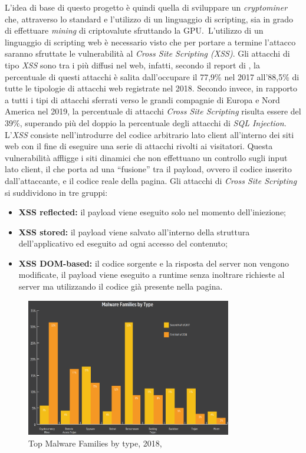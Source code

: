 \documentclass[conference]{IEEEtran}
\newcommand\citen[1]{\citeauthor{#1} \citep{#1}}
\newcommand\citetitlen[1]{\citetitle{#1} \citep{#1}}
\begin{document}
L'idea di base di questo progetto è quindi quella di sviluppare un \emph{cryptominer} che, attraverso lo standard \citetitlen{OpenGL} e l'utilizzo di un linguaggio di scripting, sia in grado di effettuare \emph{mining} di criptovalute sfruttando la GPU.\ L'utilizzo di un linguaggio di scripting web è necessario visto che per portare a termine l'attacco saranno sfruttate le vulnerabilità al \emph{Cross Site Scripting (XSS)}. Gli attacchi di tipo \emph{XSS} sono tra i più diffusi nel web, infatti, secondo il report di \citen{PositiveTechnologiesReport}, la percentuale di questi attacchi è salita dall'occupare il 77,9\% nel 2017 all'88,5\% di tutte le tipologie di attacchi web registrate nel 2018. Secondo \citen{PreciseSecurityReport} invece, in rapporto a tutti i tipi di attacchi sferrati verso le grandi compagnie di Europa e Nord America nel 2019, la percentuale di attacchi \emph{Cross Site Scripting} risulta essere del 39\%, superando più del doppio la percentuale degli attacchi di \emph{SQL Injection}.\\
L'\emph{XSS} consiste nell’introdurre del codice arbitrario lato client all'interno dei siti web con il fine di eseguire una serie di attacchi rivolti ai visitatori. Questa vulnerabilità affligge i siti dinamici che non effettuano un controllo sugli input lato client, il che porta ad una ``fusione'' tra il payload, ovvero il codice inserito dall'attaccante, e il codice reale della pagina. Gli attacchi di \emph{Cross Site Scripting} si suddividono in tre gruppi:
\begin{itemize}
  \item\textbf{XSS reflected:} il payload viene eseguito solo nel momento dell’iniezione;
  \item\textbf{XSS stored:} il payload viene salvato all'interno della struttura dell'applicativo ed eseguito ad ogni accesso del contenuto;
  \item\textbf{XSS DOM-based:} il codice sorgente e la risposta del server non vengono modificate, il payload viene eseguito a runtime senza inoltrare richieste al server ma utilizzando il codice già presente nella pagina.
\end{itemize}

\begin{figure}[hbt]
\caption{Top Malware Families by type, 2018, \citetitlen{skyboxtrends}}\label{fig:topmalwarefamilies}
\centering
\includegraphics[width=0.8\textwidth]{TopMalwareFamilies.png}
\end{figure}
\end{document}
